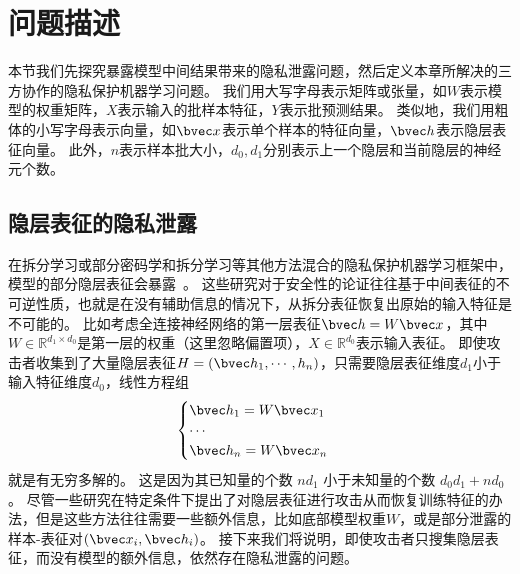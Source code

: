 \section{问题描述}
本节我们先探究暴露模型中间结果带来的隐私泄露问题，然后定义本章所解决的三方协作的隐私保护机器学习问题。
%
我们用大写字母表示矩阵或张量，如$W$表示模型的权重矩阵，$X$表示输入的批样本特征，$Y$表示批预测结果。
%
类似地，我们用粗体的小写字母表示向量，如$\bvec x$表示单个样本的特征向量，$\bvec h$表示隐层表征向量。
%
此外，$n$表示样本批大小，$d_0, d_1$分别表示上一个隐层和当前隐层的神经元个数。

\subsection{隐层表征的隐私泄露}
在拆分学习或部分密码学和拆分学习等其他方法混合的隐私保护机器学习框架中，模型的部分隐层表征会暴露~\cite{zhangqiao_2018_gelu_net,vepakomma2018split,fu2022blindfl,zhou_2022_codesign}。
%
这些研究对于安全性的论证往往基于中间表征的不可逆性质，也就是在没有辅助信息的情况下，从拆分表征恢复出原始的输入特征是不可能的。
%
比如考虑全连接神经网络的第一层表征$\bvec h=W \bvec x$，其中$W \in \mathbb R^{d_1 \times d_0}$是第一层的权重（这里忽略偏置项），$X \in \mathbb R^{d_0}$表示输入表征。
%
即使攻击者收集到了大量隐层表征$H = (\bvec h_1, \cdots, h_n)$，只需要隐层表征维度$d_1$小于输入特征维度$d_0$，线性方程组
\begin{equation}
\begin{cases}
    \bvec h_1 = W \bvec x_1 \\
    \cdots \\
    \bvec h_n = W \bvec x_n \\
\end{cases}
\end{equation}
就是有无穷多解的。
%
这是因为其已知量的个数 $nd_1$ 小于未知量的个数 $d_0d_1 + nd_0$。
%
尽管一些研究在特定条件下提出了对隐层表征进行攻击从而恢复训练特征的办法，但是这些方法往往需要一些额外信息，比如底部模型权重$W$，或是部分泄露的样本-表征对$(\bvec x_i, \bvec h_i)$。
%
接下来我们将说明，即使攻击者只搜集隐层表征，而没有模型的额外信息，依然存在隐私泄露的问题。

